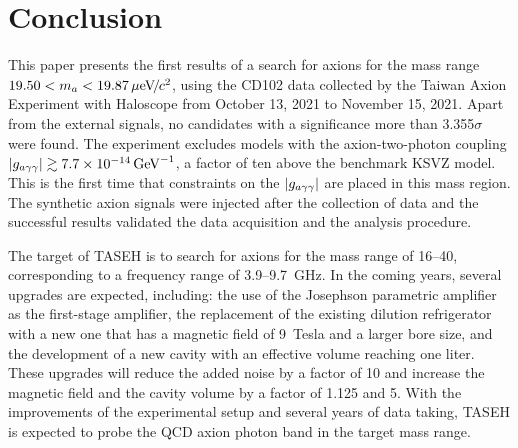 
\section{Conclusion} \label{sec:conclusion}
This paper presents the first results of a search for axions for the mass 
range $19.50 < m_a < 19.87 \,\mu\text{e\hspace{-.08em}V\hspace{-0.16em}/\hspace{-0.08em}}c^2$, using the CD102 data collected by the 
Taiwan Axion Experiment with Haloscope from October 13, 2021 to November 15, 
2021. 
Apart from the external signals, no candidates with a significance more than
3.355$\sigma$ were found. The experiment excludes models with the 
axion-two-photon coupling $\left|g_{a\gamma\gamma}\right|\gtrsim 7.7\times 10^{-14}\,\text{Ge\hspace{-.08em}V}^{-1}$, a factor of ten 
above the benchmark KSVZ model. This is the first time that 
constraints on the $\left|g_{a\gamma\gamma}\right|$ are placed in this mass region. The synthetic 
axion signals were injected after the collection of data and the 
successful results validated the data acquisition and the analysis procedure. 

The target of TASEH is to search for axions for the mass range of 
16--40\muevcc, corresponding to a frequency range of 3.9--9.7~GHz. 
In the coming years, several upgrades are expected, including: the use of 
the Josephson parametric amplifier as the first-stage amplifier, the 
replacement of the existing dilution refrigerator with a new one that has 
a magnetic field of 9~Tesla and a larger bore size, and the development of 
a new cavity with an effective volume reaching one liter. These upgrades 
will reduce the added noise by a factor of 10 and increase the magnetic 
field and the cavity volume by a factor of 1.125 and 5. With the 
improvements of the experimental setup and several years of data taking, 
TASEH is expected to probe the QCD axion photon band in the target mass range.


